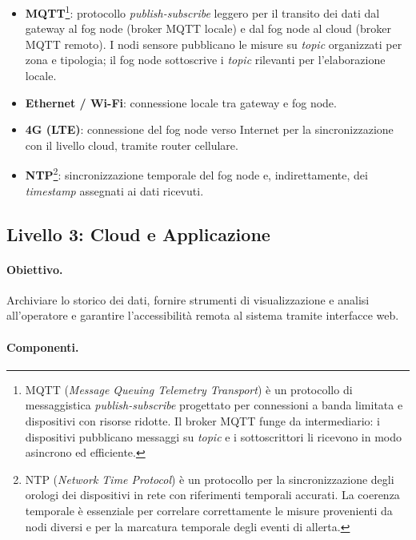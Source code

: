 \begin{itemize}
	\item \textbf{MQTT}\footnote{MQTT (\textit{Message Queuing Telemetry Transport}) è un protocollo di messaggistica \textit{publish-subscribe} progettato per connessioni a banda limitata e dispositivi con risorse ridotte. Il broker MQTT funge da intermediario: i dispositivi pubblicano messaggi su \textit{topic} e i sottoscrittori li ricevono in modo asincrono ed efficiente.}: protocollo \textit{publish-subscribe} leggero per il transito dei dati dal gateway al fog node (broker MQTT locale) e dal fog node al cloud (broker MQTT remoto). I nodi sensore pubblicano le misure su \textit{topic} organizzati per zona e tipologia; il fog node sottoscrive i \textit{topic} rilevanti per l'elaborazione locale.
	\item \textbf{Ethernet / Wi-Fi}: connessione locale tra gateway e fog node.
	\item \textbf{4G (LTE)}: connessione del fog node verso Internet per la sincronizzazione con il livello cloud, tramite router cellulare.
	\item \textbf{NTP}\footnote{NTP (\textit{Network Time Protocol}) è un protocollo per la sincronizzazione degli orologi dei dispositivi in rete con riferimenti temporali accurati. La coerenza temporale è essenziale per correlare correttamente le misure provenienti da nodi diversi e per la marcatura temporale degli eventi di allerta.}: sincronizzazione temporale del fog node e, indirettamente, dei \textit{timestamp} assegnati ai dati ricevuti.
\end{itemize}


\subsection{Livello 3: Cloud e Applicazione}

\paragraph{Obiettivo.} Archiviare lo storico dei dati, fornire strumenti di visualizzazione e analisi all'operatore e garantire l'accessibilità remota al sistema tramite interfacce web.

\paragraph{Componenti.}


